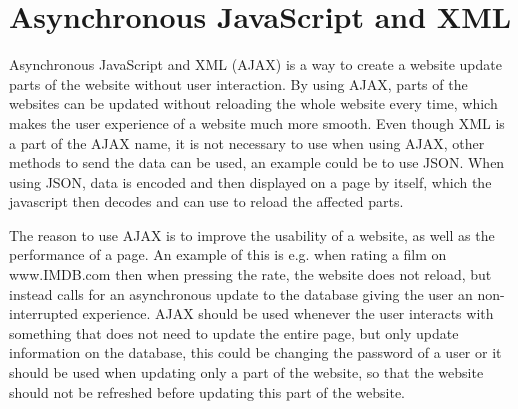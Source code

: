 \section{Asynchronous JavaScript and XML}
Asynchronous JavaScript and XML (AJAX) is a way to create a website update parts of the website without user interaction.
By using AJAX, parts of the websites can be updated without reloading the whole website every time, which makes the user experience of a website much more smooth.
Even though XML is a part of the AJAX name, it is not necessary to use when using AJAX, other methods to send the data can be used, an example could be to use JSON.
When using JSON, data is encoded and then displayed on a page by itself, which the javascript then decodes and can use to reload the affected parts.

The reason to use AJAX is to improve the usability of a website, as well as the performance of a page.
An example of this is e.g. when rating a film on www.IMDB.com then when pressing the rate, the website does not reload, but instead calls for an asynchronous update to the database giving the user an non-interrupted experience. 
AJAX should be used whenever the user interacts with something that does not need to update the entire page, but only update information on the database, this could be changing the password of a user or it should be used when updating only a part of the website, so that the website should not be refreshed before updating this part of the website.